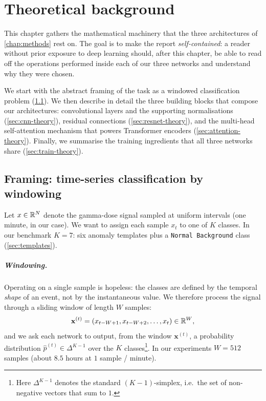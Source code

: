 \chapter{Theoretical background}
\label{chap:theory}

This chapter gathers the mathematical machinery that the three
architectures of \cref{chap:methods} rest on. The goal is to make the
report \emph{self-contained}: a reader without prior exposure to
deep learning should, after this chapter, be able to read off the
operations performed inside each of our three networks and understand
why they were chosen.

We start with the abstract framing of the task as a windowed
classification problem (\cref{sec:framing}). We then describe in detail
the three building blocks that compose our architectures:
convolutional layers and the supporting normalisations
(\cref{sec:cnn-theory}), residual connections (\cref{sec:resnet-theory}),
and the multi-head self-attention mechanism that powers Transformer
encoders (\cref{sec:attention-theory}). Finally, we summarise the
training ingredients that all three networks share
(\cref{sec:train-theory}).

\section{Framing: time-series classification by windowing}
\label{sec:framing}

Let $x \in \mathbb{R}^N$ denote the gamma-dose signal sampled at uniform
intervals (one minute, in our case). We want to assign each sample
$x_t$ to one of $K$ classes. In our benchmark $K = 7$: six anomaly
templates plus a \texttt{Normal Background} class (\cref{sec:templates}).

\paragraph{Windowing.} Operating on a single sample is hopeless: the
classes are defined by the temporal \emph{shape} of an event, not by
the instantaneous value. We therefore process the signal through a
sliding window of length $W$ samples:
\begin{equation}
    \mathbf{x}^{(t)} = (x_{t-W+1}, x_{t-W+2}, \dots, x_t) \in \mathbb{R}^W,
    \label{eq:window-theory}
\end{equation}
and we ask each network to output, from the window $\mathbf{x}^{(t)}$,
a probability distribution
$\hat{p}^{(t)} \in \Delta^{K-1}$ over the $K$ classes\footnote{Here
$\Delta^{K-1}$ denotes the standard $(K-1)$-simplex, i.e.\ the set of
non-negative vectors that sum to $1$.}. In our experiments $W=512$
samples (about $8.5$ hours at $1$ sample / minute).

